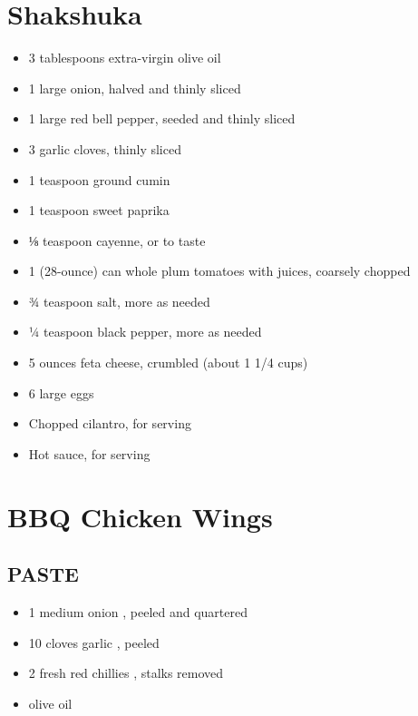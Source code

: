 \documentclass[
]{article}
\providecommand{\tightlist}{%
  \setlength{\itemsep}{0pt}\setlength{\parskip}{0pt}}
\begin{document}
\hypertarget{shakshuka}{%
\section{Shakshuka}\label{shakshuka}}

\begin{itemize}
\tightlist
\item
  3 tablespoons extra-virgin olive oil
\item
  1 large onion, halved and thinly sliced
\item
  1 large red bell pepper, seeded and thinly sliced
\item
  3 garlic cloves, thinly sliced
\item
  1 teaspoon ground cumin
\item
  1 teaspoon sweet paprika
\item
  ⅛ teaspoon cayenne, or to taste
\item
  1 (28-ounce) can whole plum tomatoes with juices, coarsely chopped
\item
  ¾ teaspoon salt, more as needed
\item
  ¼ teaspoon black pepper, more as needed
\item
  5 ounces feta cheese, crumbled (about 1 1/4 cups)
\item
  6 large eggs
\item
  Chopped cilantro, for serving
\item
  Hot sauce, for serving
\end{itemize}

\hypertarget{bbq-chicken-wings}{%
\section{BBQ Chicken Wings}\label{bbq-chicken-wings}}

\hypertarget{paste}{%
\subsection{PASTE}\label{paste}}

\begin{itemize}
\tightlist
\item
  1 medium onion , peeled and quartered
\item
  10 cloves garlic , peeled
\item
  2 fresh red chillies , stalks removed
\item
  olive oil
\end{itemize}
\end{document}
